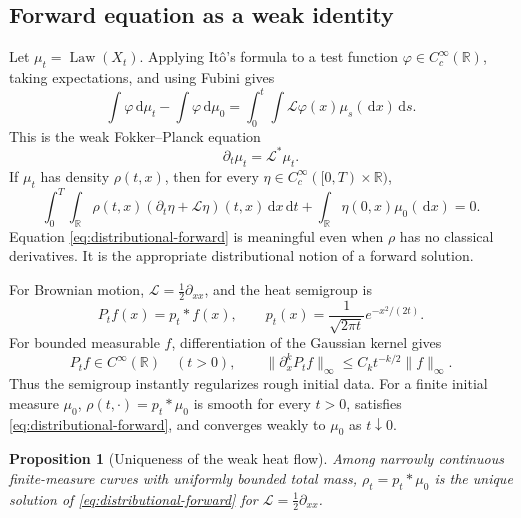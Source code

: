 \documentclass[10pt,a4paper]{article}
\numberwithin{equation}{section}
\theoremstyle{blueplain}
\newtheorem{proposition}[theorem]{Proposition}
\theoremstyle{definition}
\newcommand{\R}{\mathbb R}
\newcommand{\dd}{\,\mathrm d}
\begin{document}
\subsection{Forward equation as a weak identity}

Let \(\mu_t=\operatorname{Law}(X_t)\).  Applying It\^o's formula to a test
function \(\varphi\in C_c^\infty(\R)\), taking expectations, and using Fubini
gives
\begin{equation}
  \int\varphi\dd\mu_t-\int\varphi\dd\mu_0
  =\int_0^t\int\mathcal L\varphi(x)\mu_s(\dd x)\dd s.
  \label{eq:weak-forward-measure}
\end{equation}
This is the weak Fokker--Planck equation
\begin{equation}
  \partial_t\mu_t=\mathcal L^*\mu_t.
  \label{eq:fokker-planck-measure}
\end{equation}
If \(\mu_t\) has density \(\rho(t,x)\), then for every
\(\eta\in C_c^\infty([0,T)\times\R)\),
\begin{equation}
 \int_0^T\!\int_\R
 \rho(t,x)(\partial_t\eta+\mathcal L\eta)(t,x)\dd x\dd t
 +\int_\R\eta(0,x)\mu_0(\dd x)=0.
 \label{eq:distributional-forward}
\end{equation}
Equation \eqref{eq:distributional-forward} is meaningful even when \(\rho\)
has no classical derivatives.  It is the appropriate distributional notion of
a forward solution.

For Brownian motion, \(\mathcal L=\tfrac12\partial_{xx}\), and the heat
semigroup is
\begin{equation}
  P_tf(x)=p_t*f(x),
  \qquad
  p_t(x)=\frac1{\sqrt{2\pi t}}e^{-x^2/(2t)}.
  \label{eq:heat-semigroup-convolution}
\end{equation}
For bounded measurable \(f\), differentiation of the Gaussian kernel gives
\begin{equation}
  P_tf\in C^\infty(\R)\quad(t>0),
  \qquad
  \|\partial_x^kP_tf\|_\infty
  \le C_k t^{-k/2}\|f\|_\infty.
  \label{eq:heat-smoothing-estimate}
\end{equation}
Thus the semigroup instantly regularizes rough initial data.  For a finite
initial measure \(\mu_0\),
\(\rho(t,\cdot)=p_t*\mu_0\) is smooth for every \(t>0\), satisfies
\eqref{eq:distributional-forward}, and converges weakly to \(\mu_0\) as
\(t\downarrow0\).

\begin{proposition}[Uniqueness of the weak heat flow]
Among narrowly continuous finite-measure curves with uniformly bounded total
mass, \(\rho_t=p_t*\mu_0\) is the unique solution of
\eqref{eq:distributional-forward} for
\(\mathcal L=\tfrac12\partial_{xx}\).
\end{proposition}
\end{document}
